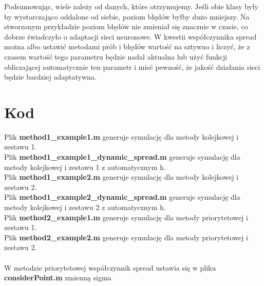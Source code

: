 \documentclass[10pt,a4paper]{article}
\begin{document}
Podsumowując, wiele zależy od danych, które otrzymujemy. Jeśli obie klasy były by wystarczająco oddalone od siebie, poziom błędów byłby dużo mniejszy. Na stworzonym przykładzie poziom błędów nie zmieniał się znacznie w czasie, co dobrze świadczyło o adaptacji sieci neuronowe. W kwestii współczynnika spread można albo ustawić metodami prób i błędów wartość na sztywno i liczyć, że z czasem wartość tego parametru będzie nadal aktualna lub użyć funkcji obliczającej automatycznie ten parametr i mieć pewność, że jakość działania sieci będzie bardziej adaptatywna. 

\section{Kod}
Plik \textbf{method1\_example1.m} generuje symulację dla metody kolejkowej i zestawu 1. \\
Plik \textbf{method1\_example1\_dynamic\_spread.m} generuje symulację dla metody kolejkowej i zestawu 1 z automatycznym h. \\
Plik \textbf{method1\_example2.m} generuje symulację dla metody kolejkowej i zestawu 2. \\
Plik \textbf{method1\_example2\_dynamic\_spread.m} generuje symulację dla metody kolejkowej i zestawu 2 z automatycznym h. \\
Plik \textbf{method2\_example1.m} generuje symulację dla metody priorytetowej i zestawu 1. \\
Plik \textbf{method2\_example2.m} generuje symulację dla metody priorytetowej i zestawu 2. \\
\\
W metodzie priorytetowej współczynnik spread ustawia się w pliku \textbf{considerPoint.m} zmienną sigma
\end{document}
